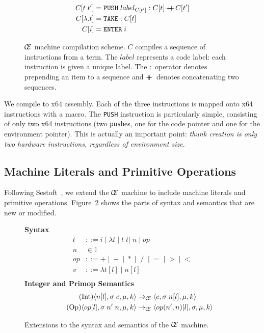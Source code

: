 \begin{figure}
\begin{align*} C[t \; t'] &= \texttt{PUSH}\;label_{C[t']}:C[t] +\!\!\!\!+\, C[t'] \\
C[\lambda.t] &= \texttt{TAKE}:C[t] \\
C[i] &= \texttt{ENTER} \; i
\end{align*}
\caption{$\mathcal{\mathcal{C} \mskip -4mu \mathcal{E}}$ machine compilation scheme. $C$ compiles a sequence of
instructions from a term. The $label$ represents a code label: each instruction
is given a unique label. The $:$ operator denotes prepending an item to a
sequence and $+\!\!\!\!+\,$ denotes concatenating two sequences.}
\label{fig:cemcompile}
\end{figure}

We compile to x64 assembly. Each of the three instructions is mapped onto
x64 instructions with a macro. The \texttt{PUSH} instruction is particularly
simple, consisting of only two x64 instructions (two \texttt{push}es, one for
the code pointer and one for the environment pointer). This is actually an
important point: \emph{thunk creation is only two hardware instructions,
regardless of environment size}.  

\subsection{Machine Literals and Primitive Operations}

Following Sestoft~\cite{sestoft}, we extend the $\mathcal{\mathcal{C} \mskip -4mu \mathcal{E}}$ machine to
include machine literals and primitive operations. Figure~\ref{fig:extsyntax}
shows the parts of syntax and semantics that are new or modified. 

\begin{figure}
\textbf{Syntax}
\begin{align*}
\tag{Term}    t &::= i \; | \; \lambda t \; | \; t \; t | \; n \; | \; op \\
\tag{Integer} n &\in \mathbb{I} \\
\tag{PrimOp} op &::= + \; | \; - \; | \; * \; | \; \; / \;\; | \; = \; | \; > \; | \; < \\
\tag{Value} v &::= \lambda t[l] \; | \; n[l] \\
\end{align*}
\textbf{Integer and Primop Semantics}
\begin{align*}
\tag{Int}
\langle n[l], \sigma \; c, \mu, k \rangle
  &\rightarrow_{\mathcal{\mathcal{C} \mskip -4mu \mathcal{E}}}
\langle c, \sigma \; n[l], \mu, k \rangle \\
\tag{Op} 
\langle op[l], \sigma \; n' \; n, \mu, k \rangle
  &\rightarrow_{\mathcal{\mathcal{C} \mskip -4mu \mathcal{E}}}
\langle op(n',n)[l], \sigma, \mu, k \rangle
\end{align*}
\caption{Extensions to the syntax and semantics of the $\mathcal{\mathcal{C} \mskip -4mu \mathcal{E}}$ machine.}
\label{fig:extsyntax}
\end{figure}

